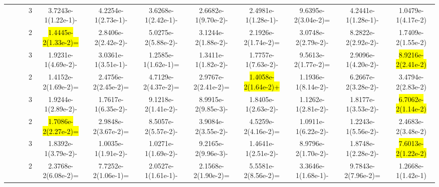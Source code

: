 \documentclass[a4paper,fleqn]{cas-dc}
\newcommand{\highlight}[1]{
	\begingroup
	\sethlcolor{Seashell}%
	\hl{#1}%
	\endgroup
}
\begin{document}
\begin{sloppypar}
\begin{table}[ht]
{\begin{tabular}{ccccccccccc}
					\multirow{8}{*}{~}&\multirow{2}{*}{~}&3	 &3.7243e-1(1.22e-1)-		&4.2254e-1(2.73e-1)-	&3.6268e-1(2.42e-1)-	&2.6682e-1(9.70e-2)-	&2.4981e-1(1.28e-1)-	&9.6395e-2(3.04e-2)=	&4.2441e-1(1.28e-1)-	&1.0479e-1(4.17e-2)\\
					
					
					\multirow{8}{*}{~}&\multirow{2}{*}{ZCAT9}&2 &\highlight{1.4445e-2(1.33e-2)=}		&2.8406e-2(2.42e-2)-	&5.0275e-2(5.88e-2)-	&3.1244e-2(1.88e-2)-	&2.1926e-2(1.74e-2)=	&3.0748e-2(2.79e-2)-	&8.2822e-2(2.92e-2)-	&1.7409e-2(1.55e-2)\\
					
					\multirow{8}{*}{~}&\multirow{2}{*}{~}&3	 &1.9231e-1(4.69e-2)-		&3.0361e-1(3.51e-1)-	&1.2585e-1(1.62e-1)=	&1.3411e-1(1.82e-2)-	&1.7757e-1(7.63e-2)-	&9.5613e-2(1.77e-2)=	&2.9096e-1(4.20e-2)-	&\highlight{8.9216e-2(2.41e-2)}\\
					\hline
					
					
					
					\multirow{8}{*}{Flat}&\multirow{2}{*}{ZCAT5}&2 &1.4152e-2(1.69e-2)=	&2.4756e-2(2.45e-2)=	&4.7129e-2(4.37e-2)=	&2.9767e-2(2.41e-2)=	&\highlight{1.4058e-2(1.64e-2)+}	&1.1936e-1(8.14e-2)-	&6.2667e-2(3.28e-2)-	&3.4794e-2(2.83e-2)\\
					
					\multirow{8}{*}{~}&\multirow{2}{*}{~}&3&1.9244e-1(2.89e-2)-	&1.7617e-1(6.35e-2)-	&9.1218e-2(1.41e-2)-	&8.9915e-2(9.85e-3)-	&1.8405e-1(2.63e-2)-	&1.1262e-1(2.81e-2)-	&1.8177e-1(3.53e-2)-	&\highlight{6.7062e-2(1.14e-2)}\\
					
					
					\multirow{8}{*}{~}&\multirow{2}{*}{ZCAT6}&2&\highlight{1.7086e-2(2.27e-2)=}		&2.9848e-2(3.67e-2)=	&8.5057e-2(5.57e-2)-	&3.9084e-2(3.55e-2)-	&4.5259e-2(4.16e-2)=	&1.0911e-1(6.22e-2)-	&1.2243e-1(5.56e-2)-	&2.4683e-2(3.48e-2)\\
					
					\multirow{8}{*}{~}&\multirow{2}{*}{~}&3 &1.8392e-1(3.79e-2)-		&1.0035e-1(1.91e-2)-	&1.0271e-1(1.69e-2)-	&9.2165e-2(9.96e-3)-	&1.4641e-1(2.51e-2)-	&8.9796e-2(1.70e-2)-	&1.8748e-1(2.28e-2)-	&\highlight{7.6013e-2(1.22e-2)}\\
					
					
					
					
					
					\multirow{8}{*}{~}&\multirow{2}{*}{ZCAT7}&2 &2.3768e-2(6.08e-2)=	&7.7252e-2(1.06e-1)=	&2.0527e-1(1.61e-1)-	&2.1568e-2(1.90e-2)=	&5.5581e-2(8.56e-2)=	&3.3646e-1(1.68e-1)-	&9.7843e-2(7.96e-2)=	&1.2668e-1(1.42e-1)\\
					

\end{tabular}}
\end{table}
\end{sloppypar}
\end{document}
